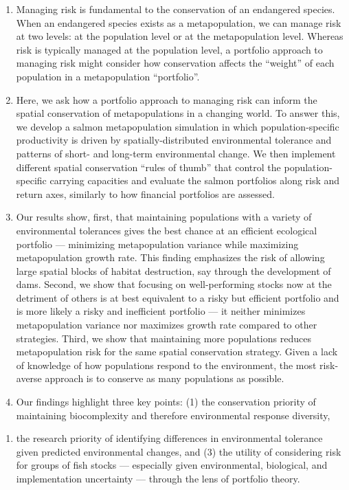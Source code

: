 \begin{enumerate}
\def\labelenumi{\arabic{enumi}.}
\item
  Managing risk is fundamental to the conservation of an endangered
  species. When an endangered species exists as a metapopulation, we can
  manage risk at two levels: at the population level or at the
  metapopulation level. Whereas risk is typically managed at the
  population level, a portfolio approach to managing risk might consider
  how conservation affects the ``weight'' of each population in a
  metapopulation ``portfolio''.
\item
  Here, we ask how a portfolio approach to managing risk can inform the
  spatial conservation of metapopulations in a changing world. To answer
  this, we develop a salmon metapopulation simulation in which
  population-specific productivity is driven by spatially-distributed
  environmental tolerance and patterns of short- and long-term
  environmental change. We then implement different spatial conservation
  ``rules of thumb'' that control the population-specific carrying
  capacities and evaluate the salmon portfolios along risk and return
  axes, similarly to how financial portfolios are assessed.
\item
  Our results show, first, that maintaining populations with a variety
  of environmental tolerances gives the best chance at an efficient
  ecological portfolio --- minimizing metapopulation variance while
  maximizing metapopulation growth rate. This finding emphasizes the
  risk of allowing large spatial blocks of habitat destruction, say
  through the development of dams. Second, we show that focusing on
  well-performing stocks now at the detriment of others is at best
  equivalent to a risky but efficient portfolio and is more likely a
  risky and inefficient portfolio --- it neither minimizes
  metapopulation variance nor maximizes growth rate compared to other
  strategies. Third, we show that maintaining more populations reduces
  metapopulation risk for the same spatial conservation strategy. Given
  a lack of knowledge of how populations respond to the environment, the
  most risk-averse approach is to conserve as many populations as
  possible.
\item
  Our findings highlight three key points: (1) the conservation priority
  of maintaining biocomplexity and therefore environmental response
  diversity,
\end{enumerate}

\begin{enumerate}
\def\labelenumi{(\arabic{enumi})}
\setcounter{enumi}{1}
\itemsep1pt\parskip0pt
\item
  the research priority of identifying differences in environmental
  tolerance given predicted environmental changes, and (3) the utility
  of considering risk for groups of fish stocks --- especially given
  environmental, biological, and implementation uncertainty --- through
  the lens of portfolio theory.
\end{enumerate}

